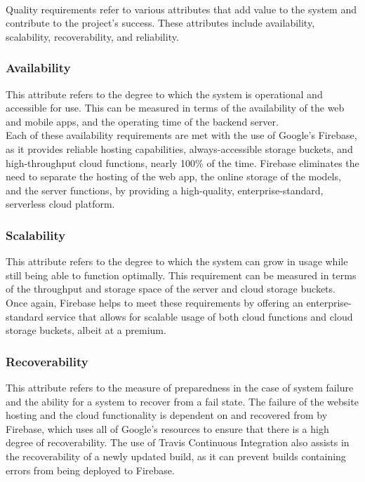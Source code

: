 \documentclass[a4paper, 11pt]{article}
\begin{document}
        \paragraph{}
        Quality requirements refer to various attributes that add value to the system and contribute to the project’s success. These attributes include availability, scalability, recoverability, and reliability.
        
        \subsubsection{Availability}
        This attribute refers to the degree to which the system is operational and accessible for use. This can be measured in terms of the availability of the web and mobile apps, and the operating time of the backend server.\\
        Each of these availability requirements are met with the use of Google’s Firebase, as it provides reliable hosting capabilities, always-accessible storage buckets, and high-throughput cloud functions, nearly 100\% of the time. Firebase eliminates the need to separate the hosting of the web app, the online storage of the models, and the server functions, by providing a high-quality, enterprise-standard, serverless cloud platform.

        \subsubsection{Scalability}
        This attribute refers to the degree to which the system can grow in usage while still being able to function optimally. This requirement can be measured in terms of the throughput and storage space of the server and cloud storage buckets. Once again, Firebase helps to meet these requirements by offering an enterprise-standard service that allows for scalable usage of both cloud functions and cloud storage buckets, albeit at a premium.
        
        \subsubsection{Recoverability}
        This attribute refers to the measure of preparedness in the case of system failure and the ability for a system to recover from a fail state. The failure of the website hosting and the cloud functionality is dependent on and recovered from by Firebase, which uses all of Google’s resources to ensure that there is a high degree of recoverability. The use of Travis Continuous Integration also assists in the recoverability of a newly updated build, as it can prevent builds containing errors from being deployed to Firebase.
        
\end{document}
